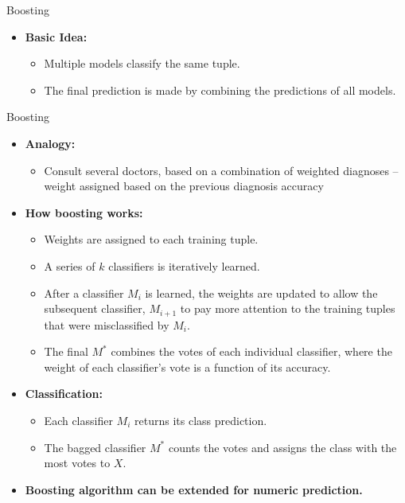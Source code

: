 \begin{frame}{Boosting}
	\vspace*{-1em}


	\begin{itemize}
		\item \textbf{Basic Idea:}
		      \begin{itemize}
			      \item Multiple models classify the same tuple.
			      \item The final prediction is made by combining the predictions of all models.
		      \end{itemize}
	\end{itemize}



	\vspace*{1em}

	\begin{center}
	\end{center}

\end{frame}


\begin{frame}{Boosting}
	\begin{itemize}
		\item \textbf{Analogy:}
		      \begin{itemize}
			      \item Consult several doctors, based on a combination of weighted diagnoses -- weight assigned based on the previous diagnosis accuracy
		      \end{itemize}
		\item \textbf{How boosting works:}
		      \begin{itemize}
			      \item Weights are assigned to each training tuple.
			      \item A series of $k$ classifiers is iteratively learned.
			      \item After a classifier $M_i$ is learned, the weights are updated to allow the subsequent classifier, $M_{i+1}$ to pay more attention to the training tuples that were misclassified by $M_i$.
			      \item The final $M^*$ combines the votes of each individual classifier, where the weight of each classifier's vote is a function of its accuracy.
		      \end{itemize}
		\item \textbf{Classification:}
		      \begin{itemize}
			      \item Each classifier $M_i$ returns its class prediction.
			      \item The bagged classifier $M^*$ counts the votes and assigns the class with the most votes to $X$.
		      \end{itemize}
		\item \textbf{Boosting algorithm can be extended for numeric prediction.}
	\end{itemize}
\end{frame}



